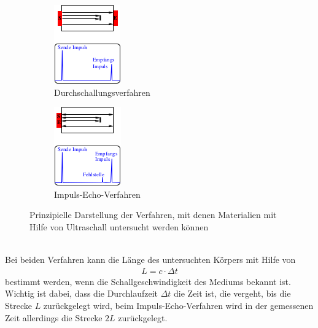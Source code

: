 \begin{figure}[h!]
	\centering
	\begin{subfigure}{.5\textwidth}
		\centering
		\includegraphics[width=.4\textwidth]{Durchschallung.png}
		\caption{Durchschallungsverfahren}
		\label{fig:Durchschall}
	\end{subfigure}%
	\begin{subfigure}{.5\textwidth}
		\centering
		\includegraphics[width=.4\textwidth]{ImpulsEcho.png}
		\caption{Impuls-Echo-Verfahren}
		\label{fig:ImpulsEcho}
	\end{subfigure}
	\caption{Prinzipielle Darstellung der Verfahren, mit denen Materialien mit Hilfe von Ultraschall untersucht werden können}
	\label{fig:test}
\end{figure} \\
Bei beiden Verfahren kann die Länge des untersuchten Körpers mit Hilfe von
\begin{align}
	L = c \cdot \Delta t
\end{align}
bestimmt werden, wenn die Schallgeschwindigkeit des Mediums bekannt ist. Wichtig ist dabei, dass die Durchlaufzeit $\Delta t$ die Zeit ist, die vergeht, bis die Strecke $L$ zurückgelegt wird, beim Impuls-Echo-Verfahren wird in der gemessenen Zeit allerdings die Strecke $2L$ zurückgelegt.
